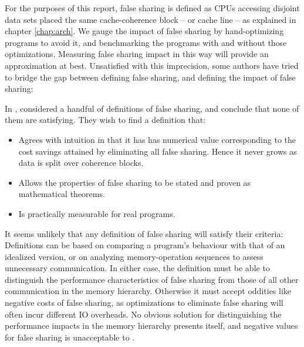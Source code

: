 For the purposes of this report, false sharing is defined as CPUs accessing
disjoint data sets placed the same cache-coherence block -- or cache line -- as
explained in chapter \ref{chap:arch}. We gauge the impact of false sharing by
hand-optimizing programs to avoid it, and benchmarking the programs with and
without those optimizations. Measuring false sharing impact in this way will
provide an approximation at best. Unsatisfied with this imprecision, some
authors have tried to bridge the gap between defining false sharing, and
defining the impact of false sharing:

In \citeyear{falsedef}, \citeauthor{falsedef} \cite{falsedef} considered a handful
of definitions of false sharing, and conclude that none of them are satisfying.
They wish to find a definition that:

\begin{itemize}
	\item Agrees with intuition in that it has has numerical value
		corresponding to the cost savings attained by eliminating all
		false sharing. Hence it never grows as data is split over
		coherence blocks.
	\item Allows the properties of false sharing to be stated and proven as
		mathematical theorems.
	\item Is practically measurable for real programs.
\end{itemize}

It seems unlikely that any definition of false sharing will satisfy their
criteria: Definitions can be based on comparing a program's
behaviour with that of an idealized version\footnotemark, or on analyzing
memory-operation sequences to assess unnecessary communication. In either case,
the definition must be able to distinguish the performance characteristics of false
sharing from those of all other communication in the memory hierarchy. Otherwise
it must accept oddities like negative costs of false sharing, as optimizations
to eliminate false sharing will often incur different IO overheads. No obvious
solution for distinguishing the performance impacts in the memory hierarchy
presents itself, and negative values for false sharing is unacceptable to
\citeauthor{falsedef}.


